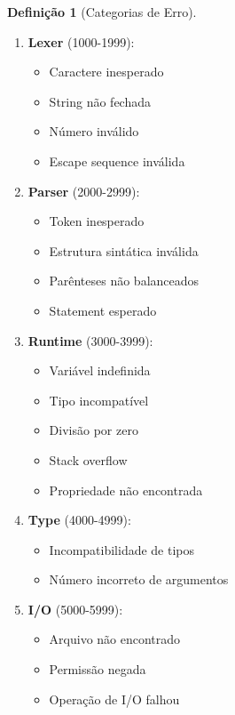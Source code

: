 \documentclass[12pt,a4paper]{article}
\theoremstyle{definition}
\newtheorem{definition}{Definição}[section]
\begin{document}
\begin{definition}[Categorias de Erro]
\begin{enumerate}
    \item \textbf{Lexer} (1000-1999):
    \begin{itemize}[noitemsep]
        \item Caractere inesperado
        \item String não fechada
        \item Número inválido
        \item Escape sequence inválida
    \end{itemize}
    
    \item \textbf{Parser} (2000-2999):
    \begin{itemize}[noitemsep]
        \item Token inesperado
        \item Estrutura sintática inválida
        \item Parênteses não balanceados
        \item Statement esperado
    \end{itemize}
    
    \item \textbf{Runtime} (3000-3999):
    \begin{itemize}[noitemsep]
        \item Variável indefinida
        \item Tipo incompatível
        \item Divisão por zero
        \item Stack overflow
        \item Propriedade não encontrada
    \end{itemize}
    
    \item \textbf{Type} (4000-4999):
    \begin{itemize}[noitemsep]
        \item Incompatibilidade de tipos
        \item Número incorreto de argumentos
    \end{itemize}
    
    \item \textbf{I/O} (5000-5999):
    \begin{itemize}[noitemsep]
        \item Arquivo não encontrado
        \item Permissão negada
        \item Operação de I/O falhou
    \end{itemize}
    

\end{enumerate}
\end{definition}
\end{document}
